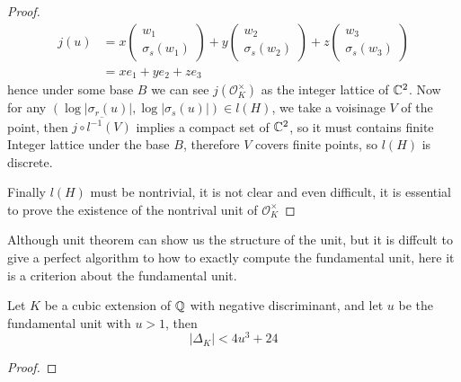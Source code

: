 \begin{theorem}
\begin{proof}
         \begin{align*}
            j(u) &= x \begin{pmatrix}
                w_1 \\
                \sigma_s(w_1)
             \end{pmatrix}+y\begin{pmatrix}
                w_2 \\
                \sigma_s(w_2)
             \end{pmatrix}+z\begin{pmatrix}
                w_3 \\
                \sigma_s(w_3)
             \end{pmatrix} \\
             &= xe_1+ye_2+ze_3
         \end{align*}
        hence under some base \(B\) we can see \(j({\mathcal{O}_K^\times})\) as the integer lattice of \(\mathbb{C}^2\). Now for any \((\log|\sigma_r(u)|,\log|\sigma_s(u)|) \in l(H)\), we take a voisinage \(V\) of the point, then \(\overline{j\circ l^{-1}(V)}\) implies a compact set of \(\mathbb{C}^2\), so it must contains finite Integer lattice under the base \(B\), therefore \(V\) covers finite points, so \(l(H)\) is discrete.

        Finally \(l(H)\) must be nontrivial, it is not clear and even difficult, it is essential to prove the existence of the nontrival unit of \(\mathcal{O}_K^{\times}\)
    \end{proof}
\end{theorem}

Although unit theorem can show us the structure of the unit, but it is diffcult to give a perfect algorithm to how to exactly compute the fundamental unit, here it is a criterion about the fundamental unit.
\begin{lemma} \label{criterion}
    Let \(K\) be a cubic extension of \(\mathbb{Q}\) with negative discriminant, and let \(u\) be the fundamental unit with \(u>1\), then 
    \[|\Delta_K| < 4 u^3 + 24\]

    \begin{proof}
        
    \end{proof}
\end{lemma}

